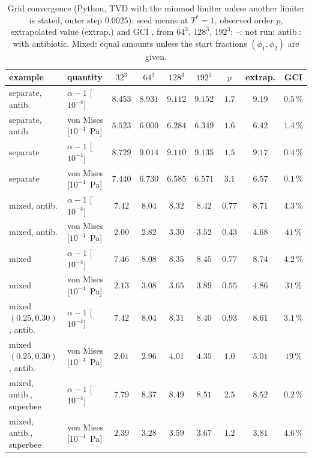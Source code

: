 \documentclass[11pt,a4paper]{article}
\begin{document}
\begin{table}[htbp]
  \centering
  \caption{Grid convergence (Python, TVD with the minmod limiter unless another limiter is stated, outer step $0.0025$): seed means at $T^*=1$, observed order $p$, extrapolated value (extrap.) and GCI \citep{Celik2008GCI}, from $64^3$, $128^3$, $192^3$; --: not run; antib.: with antibiotic. Mixed: equal amounts unless the start fractions $(\phi_1,\phi_2)$ are given.}
  \label{tab:gci}
  \small
  \setlength{\tabcolsep}{2.4pt}
  \begin{tabular}{llccccccc}
    \toprule
    example & quantity & $32^3$ & $64^3$ & $128^3$ & $192^3$ & $p$ & extrap. & GCI \\
    \midrule
    separate, antib. & $\alpha-1$ [$10^{-4}$] & $8.453$ & $8.931$ & $9.112$ & $9.152$ & $1.7$ & $9.19$ & $0.5\,\%$ \\
    separate, antib. & von Mises [$10^{-4}$~Pa] & $5.523$ & $6.000$ & $6.284$ & $6.349$ & $1.6$ & $6.42$ & $1.4\,\%$ \\
    separate & $\alpha-1$ [$10^{-4}$] & $8.729$ & $9.014$ & $9.110$ & $9.135$ & $1.5$ & $9.17$ & $0.4\,\%$ \\
    separate & von Mises [$10^{-4}$~Pa] & $7.440$ & $6.730$ & $6.585$ & $6.571$ & $3.1$ & $6.57$ & $0.1\,\%$ \\
    mixed, antib. & $\alpha-1$ [$10^{-4}$] & $7.42$ & $8.04$ & $8.32$ & $8.42$ & $0.77$ & $8.71$ & $4.3\,\%$ \\
    mixed, antib. & von Mises [$10^{-4}$~Pa] & $2.00$ & $2.82$ & $3.30$ & $3.52$ & $0.43$ & $4.68$ & $41\,\%$ \\
    mixed & $\alpha-1$ [$10^{-4}$] & $7.46$ & $8.08$ & $8.35$ & $8.45$ & $0.77$ & $8.74$ & $4.2\,\%$ \\
    mixed & von Mises [$10^{-4}$~Pa] & $2.13$ & $3.08$ & $3.65$ & $3.89$ & $0.55$ & $4.86$ & $31\,\%$ \\
    mixed $(0.25,0.30)$, antib. & $\alpha-1$ [$10^{-4}$] & $7.42$ & $8.04$ & $8.31$ & $8.40$ & $0.93$ & $8.61$ & $3.1\,\%$ \\
    mixed $(0.25,0.30)$, antib. & von Mises [$10^{-4}$~Pa] & $2.01$ & $2.96$ & $4.01$ & $4.35$ & $1.0$ & $5.01$ & $19\,\%$ \\
    \midrule
    mixed, antib., superbee & $\alpha-1$ [$10^{-4}$] & $7.79$ & $8.37$ & $8.49$ & $8.51$ & $2.5$ & $8.52$ & $0.2\,\%$ \\
    mixed, antib., superbee & von Mises [$10^{-4}$~Pa] & $2.39$ & $3.28$ & $3.59$ & $3.67$ & $1.2$ & $3.81$ & $4.6\,\%$ \\

\end{tabular}
\end{table}
\end{document}
